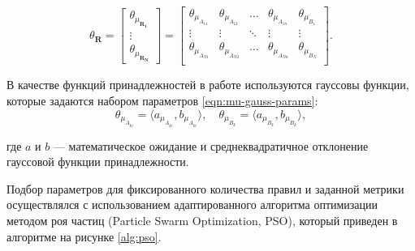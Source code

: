 \begin{equation}
	\label{eqn:theta-matrix-general}
	\theta_{\mathbf{R}} = \begin{bmatrix}
		\theta_{\mu_{\mathbf{R_1}}}\\
		\vdots\\
		\theta_{\mu_{\mathbf{R_N}}}
	\end{bmatrix} = \begin{bmatrix}
		\theta_{\mu_{A_{11}}} & \theta_{\mu_{A_{12}}} & \dots & \theta_{\mu_{A_{1n}}} & \theta_{\mu_{B_{1}}} \\
		\vdots & \vdots & \ddots & \vdots & \vdots \\
		\theta_{\mu_{A_{N1}}} & \theta_{\mu_{A_{N2}}} & \dots & \theta_{\mu_{A_{Nn}}} & \theta_{\mu_{B_{N}}} \\
	\end{bmatrix}.
\end{equation}

В качестве функций принадлежностей в работе используются гауссовы функции, которые задаются набором параметров \eqref{eqn:mu-gauss-params}:
\begin{equation}
	\label{eqn:mu-gauss-params}
	\theta_{\mu_{A_{ki}}} = \langle a_{\mu_{A_{ki}}}, b_{\mu_{A_{ki}}}\rangle,\quad\theta_{\mu_{B_{k}}} = \langle a_{\mu_{B_{k}}}, b_{\mu_{B_{k}}}\rangle,
\end{equation}

где $a$ и $b$ --- математическое ожидание и среднеквадратичное отклонение гауссовой функции принадлежности.
 
Подбор параметров для фиксированного количества правил и заданной метрики осуществлялся с использованием адаптированного алгоритма оптимизации методом роя частиц (Particle Swarm Optimization, PSO), который приведен в алгоритме на рисунке \ref{alg:pso}.
 

